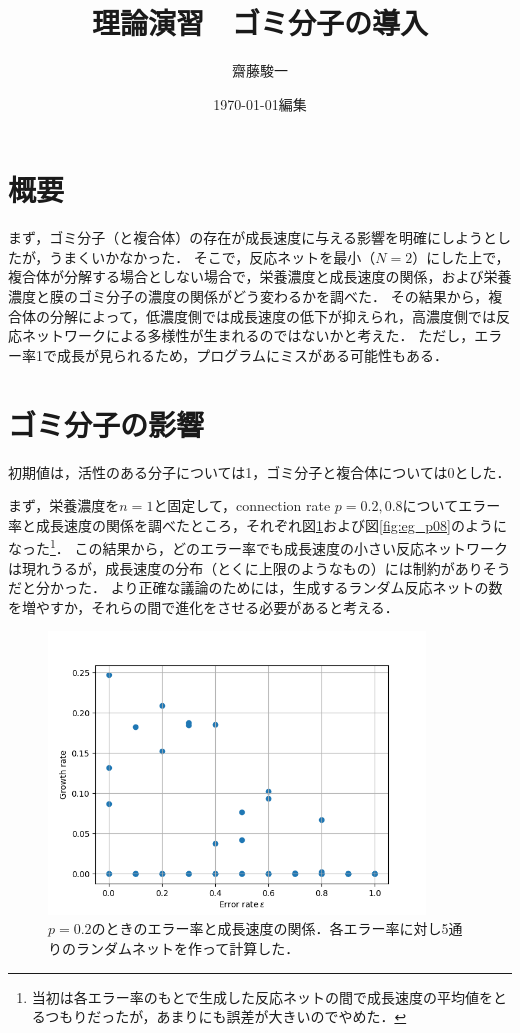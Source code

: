 \documentclass[a4paper,11pt]{jsarticle}
\begin{document}
\title{理論演習　ゴミ分子の導入}
\author{齋藤駿一}
\date{\today 編集}
\maketitle

\section{概要}

まず，ゴミ分子（と複合体）の存在が成長速度に与える影響を明確にしようとしたが，うまくいかなかった．
そこで，反応ネットを最小（$N=2$）にした上で，複合体が分解する場合としない場合で，栄養濃度と成長速度の関係，および栄養濃度と膜のゴミ分子の濃度の関係がどう変わるかを調べた．
その結果から，複合体の分解によって，低濃度側では成長速度の低下が抑えられ，高濃度側では反応ネットワークによる多様性が生まれるのではないかと考えた．
ただし，エラー率1で成長が見られるため，プログラムにミスがある可能性もある．

\section{ゴミ分子の影響}
初期値は，活性のある分子については1，ゴミ分子と複合体については0とした．

まず，栄養濃度を$n=1$と固定して，connection rate $p=0.2,0.8$についてエラー率と成長速度の関係を調べたところ，それぞれ図\ref{fig:eg_p02}および図\ref{fig:eg_p08}のようになった\footnote{当初は各エラー率のもとで生成した反応ネットの間で成長速度の平均値をとるつもりだったが，あまりにも誤差が大きいのでやめた．}．
この結果から，どのエラー率でも成長速度の小さい反応ネットワークは現れうるが，成長速度の分布（とくに上限のようなもの）には制約がありそうだと分かった．
より正確な議論のためには，生成するランダム反応ネットの数を増やすか，それらの間で進化をさせる必要があると考える．

\begin{figure}[htbp]
  \centering
  \includegraphics[width=10cm]{error_rate_growth_rate_N5_T5_p02_2.png}
  \caption{$p=0.2$のときのエラー率と成長速度の関係．各エラー率に対し5通りのランダムネットを作って計算した．}
  \label{fig:eg_p02}
\end{figure}
\end{document}

